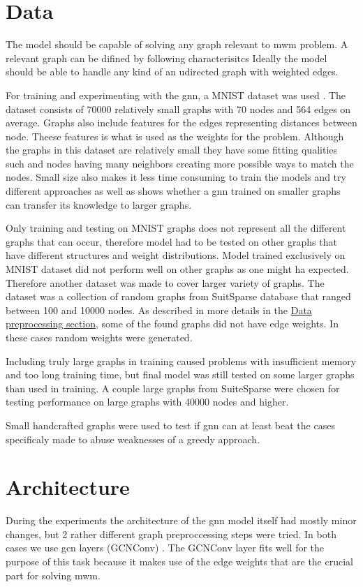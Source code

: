 \section{Data}

The model should be capable of solving any graph relevant to \gls{mwm} problem. A relevant graph can be difined by following characterisitcs
Ideally the model should be able to handle any kind of an udirected graph with weighted edges.

For training and experimenting with the \gls{gnn}, a MNIST dataset was used \cite{dwivedi2022benchmarking}. The dataset consists of 70000 relatively small graphs with 70 nodes and 564 edges on average. Graphs also include features for the edges representing distances between node. Theese features is what is used as the weights for the problem. Although the graphs in this dataset are relatively small they have some fitting qualities such and nodes having many neighbors creating more possible ways to match the nodes. Small size also makes it less time consuming to train the models and try different approaches as well as shows whether a \gls{gnn} trained on smaller graphs can transfer its knowledge to larger graphs.

Only training and testing on MNIST graphs does not represent all the different graphs that can occur, therefore model had to be tested on other graphs that have different structures and weight distributions. Model trained exclusively on MNIST dataset did not perform well on other graphs as one might ha expected. Therefore another dataset was made to cover larger variety of graphs. The dataset was a collection of random graphs from SuitSparse database that ranged between 100 and 10000 nodes. As described in more details in the \hyperref[sec:preprocessing]{Data preprocessing section}, some of the found graphs did not have edge weights. In these cases random weights were generated.

Including truly large graphs in training caused problems with insufficient memory and too long training time, but final model was still tested on some larger graphs than used in training. A couple large graphs from SuiteSparse were chosen for testing performance on large graphs with 40000 nodes and higher.

Small handcrafted graphs were used to test if \gls{gnn} can at least beat the cases specificaly made to abuse weaknesses of a greedy approach.

\section{Architecture}
\label{sec:architecture}
During the experiments the architecture of the \gls{gnn} model itself had mostly minor changes, but 2 rather different graph preproccessing steps were tried. In both cases we use \gls{gcn} layers (GCNConv) \cite{gcnpaper}. The GCNConv layer fits well for the purpose of this task because it makes use of the edge weights that are the crucial part for solving \gls{mwm}.

